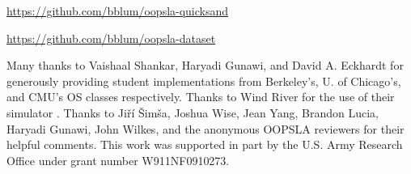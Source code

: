 \documentclass[10pt,times,numbers]{sigplanconf}
\begin{document}
\url{https://github.com/bblum/oopsla-quicksand}

\url{https://github.com/bblum/oopsla-dataset}





%

\acks

Many thanks to Vaishaal Shankar, Haryadi Gunawi, and David A. Eckhardt for generously providing student implementations from Berkeley's, U. of Chicago's, and CMU's OS classes respectively.
Thanks to Wind River for the use of their simulator \simics.
Thanks to
Ji\v{r}\'{i} \v{S}im\v{s}a, Joshua Wise, Jean Yang, Brandon Lucia, Haryadi Gunawi, John Wilkes, and
the anonymous OOPSLA reviewers for their helpful comments.
This work was supported in part by
the U.S. Army Research Office under grant number W911NF0910273.



{}
\end{document}
